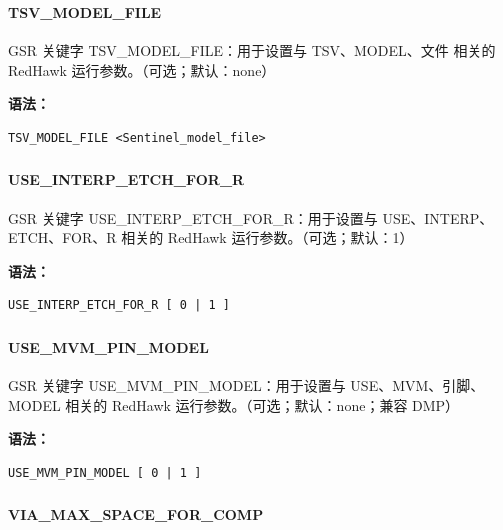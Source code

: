 \subsubsection{}
\paragraph*{TSV_MODEL_FILE}

GSR 关键字 TSV_MODEL_FILE：用于设置与 TSV、MODEL、文件 相关的 RedHawk 运行参数。（可选；默认：none）

\textbf{语法：}
\begin{lstlisting}
TSV_MODEL_FILE <Sentinel_model_file>
\end{lstlisting}

\subsubsection{}
\paragraph*{USE_INTERP_ETCH_FOR_R}

GSR 关键字 USE_INTERP_ETCH_FOR_R：用于设置与 USE、INTERP、ETCH、FOR、R 相关的 RedHawk 运行参数。（可选；默认：1）

\textbf{语法：}
\begin{lstlisting}
USE_INTERP_ETCH_FOR_R [ 0 | 1 ]
\end{lstlisting}

\subsubsection{}
\paragraph*{USE_MVM_PIN_MODEL}

GSR 关键字 USE_MVM_PIN_MODEL：用于设置与 USE、MVM、引脚、MODEL 相关的 RedHawk 运行参数。（可选；默认：none；兼容 DMP）

\textbf{语法：}
\begin{lstlisting}
USE_MVM_PIN_MODEL [ 0 | 1 ]
\end{lstlisting}

\subsubsection{}
\paragraph*{VIA_MAX_SPACE_FOR_COMP}

